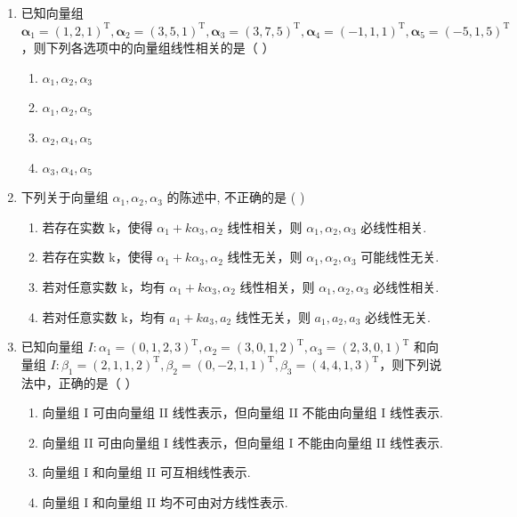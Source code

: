\documentclass[12pt, a4paper]{ctexart}
\begin{document}
\begin{enumerate}
    \item 已知向量组 $ \boldsymbol{\alpha}_{1}=(1,2,1)^{\mathrm{T}},\boldsymbol{\alpha}_{2}=(3,5,1)^{\mathrm{T}},\boldsymbol{\alpha}_{3}=(3,7,5)^{\mathrm{T}},\boldsymbol{\alpha}_{4}=(-1,1,1)^{\mathrm{T}},\boldsymbol{\alpha}_{5}=(-5,1,5)^{\mathrm{T}} $，则下列各选项中的向量组线性相关的是（ \underline{\hspace{1cm}} ）
    \begin{enumerate}[label=(\Alph*)]
        \item $ \alpha_{1},\alpha_{2},\alpha_{3} $
        \item $ \alpha_{1},\alpha_{2},\alpha_{5} $
        \item $ \alpha_{2},\alpha_{4},\alpha_{5} $
        \item $ \alpha_{3},\alpha_{4},\alpha_{5} $
    \end{enumerate}

    \item 下列关于向量组 $ \alpha_{1},\alpha_{2},\alpha_{3} $ 的陈述中, 不正确的是 ( \underline{\hspace{1cm}} )
    \begin{enumerate}[label=(\Alph*)]
        \item 若存在实数 k，使得 $ \alpha_{1} + k\alpha_{3}, \alpha_{2} $ 线性相关，则 $ \alpha_{1}, \alpha_{2}, \alpha_{3} $ 必线性相关.
        \item 若存在实数 k，使得 $ \alpha_{1} + k\alpha_{3}, \alpha_{2} $ 线性无关，则 $ \alpha_{1}, \alpha_{2}, \alpha_{3} $ 可能线性无关.
        \item 若对任意实数 k，均有 $ \alpha_{1} + k\alpha_{3}, \alpha_{2} $ 线性相关，则 $ \alpha_{1}, \alpha_{2}, \alpha_{3} $ 必线性相关.
        \item 若对任意实数 k，均有 $ a_{1} + k a_{3}, a_{2} $ 线性无关，则 $ a_{1}, a_{2}, a_{3} $ 必线性无关.
    \end{enumerate}

    \item 已知向量组 $ I: \alpha_1 = (0, 1, 2, 3)^\mathrm{T}, \alpha_2 = (3, 0, 1, 2)^\mathrm{T}, \alpha_3 = (2, 3, 0, 1)^\mathrm{T} $ 和向量组 $ I: \beta_1 = (2, 1, 1, 2)^\mathrm{T}, \beta_2 = (0, -2, 1, 1)^\mathrm{T}, \beta_3 = (4, 4, 1, 3)^\mathrm{T} $，则下列说法中，正确的是（ \underline{\hspace{1cm}} ）
    \begin{enumerate}[label=(\Alph*)]
        \item 向量组 I 可由向量组 II 线性表示，但向量组 II 不能由向量组 I 线性表示.
        \item 向量组 II 可由向量组 I 线性表示，但向量组 I 不能由向量组 II 线性表示.
        \item 向量组 I 和向量组 II 可互相线性表示.
        \item 向量组 I 和向量组 II 均不可由对方线性表示.
    \end{enumerate}


\end{enumerate}
\end{document}
